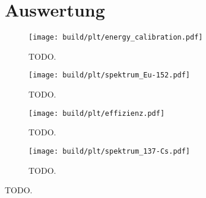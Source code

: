 \section{Auswertung}
\label{sec:auswertung}

\begin{figure}
    \centering
    \texttt{[image: build/plt/energy\_calibration.pdf]}
    \caption{TODO.}
    \label{fig:TODO}
\end{figure}

\begin{figure}
    \centering
    \texttt{[image: build/plt/spektrum\_Eu-152.pdf]}
    \caption{TODO.}
    \label{fig:TODO}
\end{figure}

\begin{figure}
    \centering
    \texttt{[image: build/plt/effizienz.pdf]}
    \caption{TODO.}
    \label{fig:TODO}
\end{figure}

\begin{figure}
    \centering
    \texttt{[image: build/plt/spektrum\_137-Cs.pdf]}
    \caption{TODO.}
    \label{fig:TODO}
\end{figure}

\begin{table}
    \centering
    \caption{TODO.}
    \label{tab:TODO}
\end{table}
